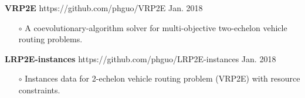 \documentclass[margin]{res}
\begin{document}
\begin{resume}
\textbf{{VRP2E }} https://github.com/phguo/VRP2E \hfill Jan. 2018
\begin{itemize} \itemsep -2pt
\item[\(\circ\)] A coevolutionary-algorithm solver for multi-objective two-echelon vehicle routing problems.
\end{itemize} \vspace{-.5em}
\textbf{{LRP2E-instances }} https://github.com/phguo/LRP2E-instances \hfill Jan. 2018
\begin{itemize} \itemsep -2pt
\item[\(\circ\)] Instances data for 2-echelon vehicle routing problem (VRP2E) with resource constraints. 
\end{itemize}


\end{resume} 
\end{document}
